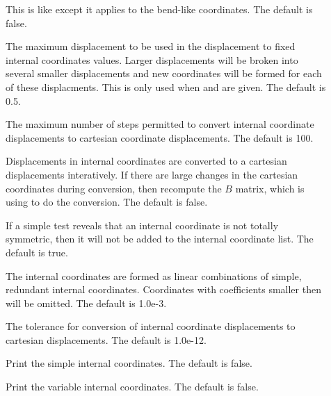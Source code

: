\begin{description}
  \item[] This is like 
    except it applies to the bend-like coordinates.  The default is false.

  \item[] The maximum displacement to be used in
    the displacement to fixed internal coordinates values.  Larger
    displacements will be broken into several smaller displacements and new
    coordinates will be formed for each of these displacments. This is only
    used when  and  are given.  The
    default is 0.5.

  \item[] The maximum number of steps permitted
    to convert internal coordinate displacements to cartesian coordinate
    displacements.  The default is 100.
               
  \item[] Displacements in internal coordinates are
     converted to a cartesian displacements interatively.  If there are
     large changes in the cartesian coordinates during conversion, then
     recompute the $B$ matrix, which is using to do the conversion.  The
     default is false.

  \item[] If a simple test reveals that an
     internal coordinate is not totally symmetric, then it will not be
     added to the internal coordinate list.  The default is true.
               
  \item[] The internal coordinates are formed as
     linear combinations of simple, redundant internal coordinates.
     Coordinates with coefficients smaller then 
     will be omitted. The default is 1.0e-3.

  \item[] The tolerance for conversion of
     internal coordinate displacements to cartesian displacements.  The
     default is 1.0e-12.
               
  \item[] Print the simple internal coordinates.
     The default is false.
               
  \item[] Print the variable internal
     coordinates.  The default is false.
               

\end{description}
